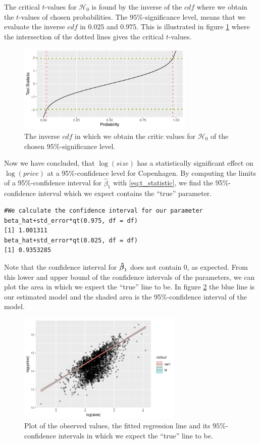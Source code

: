 The critical $t$-values for $\mathcal{H}_0$ is found by the inverse of the $cdf$ where we obtain the $t$-values of chosen probabilities. 
The $95\%$-significance level, means that we evaluate the inverse $cdf$ in $0.025$ and $0.975$. 
This is illustrated in figure \ref{fig:CDF_inverse} where the intersection of the dotted lines gives the critical $t$-values.
\begin{figure}[H]
    \centering
    \includegraphics[width = 0.75\textwidth]{figures/Nanna/cdf.pdf}
    \caption{The inverse $cdf$ in which we obtain the critic values for $\mathcal{H}_0$ of the chosen $95\%$-significance level.}
    \label{fig:CDF_inverse}
\end{figure}
Now we have concluded, that $\log(size)$ has a statistically significant effect on $\log(price)$ at a 95\%-confidence level for Copenhagen. 
By computing the limits of a 95\%-confidence interval for $\hat{\beta}_1$ with \eqref{eq:t_statistic}, we find the 95\%-confidence interval which we expect contains the ``true'' parameter.
\begin{lstlisting}
#We calculate the confidence interval for our parameter
beta_hat+std_error*qt(0.975, df = df)
[1] 1.001311
beta_hat+std_error*qt(0.025, df = df)
[1] 0.9353285
\end{lstlisting}
Note that the confidence interval for $\operatorname{\boldsymbol{\hat{\beta}}}_1$ does not contain 0, as expected.
From this lower and upper bound of the confidence intervals of the parameters, we can plot the area in which we expect the ``true'' line to be. 
In figure \ref{fig:t_distributionplot2} the blue line is our estimated model and the shaded area is the 95\%-confidence interval of the model. 
\begin{figure}[H]
    \centering
    \includegraphics[width = 0.7\textwidth]{figures/Nanna/Confidence_interval.pdf}
    \caption{Plot of the observed values, the fitted regression line and its $95\%$-confidence intervals in which we expect the ``true'' line to be.}
    \label{fig:t_distributionplot2}
\end{figure}

